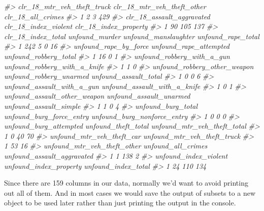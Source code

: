 \documentclass[
  12pt,
]{book}
\newenvironment{Shaded}{\begin{snugshade}}{\end{snugshade}}
\newcommand{\CommentTok}[1]{\textcolor[rgb]{0.37,0.37,0.37}{\textit{#1}}}
\begin{document}
\begin{Shaded}
\begin{Highlighting}[]
\CommentTok{\#>   clr\_18\_mtr\_veh\_theft\_truck clr\_18\_mtr\_veh\_theft\_other clr\_18\_all\_crimes}
\CommentTok{\#> 1                          2                          3               429}
\CommentTok{\#>   clr\_18\_assault\_aggravated clr\_18\_index\_violent clr\_18\_index\_property}
\CommentTok{\#> 1                        90                  105                   137}
\CommentTok{\#>   clr\_18\_index\_total unfound\_murder unfound\_manslaughter unfound\_rape\_total}
\CommentTok{\#> 1                242              5                    0                 16}
\CommentTok{\#>   unfound\_rape\_by\_force unfound\_rape\_attempted unfound\_robbery\_total}
\CommentTok{\#> 1                    16                      0                     1}
\CommentTok{\#>   unfound\_robbery\_with\_a\_gun unfound\_robbery\_with\_a\_knife}
\CommentTok{\#> 1                          1                            0}
\CommentTok{\#>   unfound\_robbery\_other\_weapon unfound\_robbery\_unarmed unfound\_assault\_total}
\CommentTok{\#> 1                            0                       0                     6}
\CommentTok{\#>   unfound\_assault\_with\_a\_gun unfound\_assault\_with\_a\_knife}
\CommentTok{\#> 1                          0                            1}
\CommentTok{\#>   unfound\_assault\_other\_weapon unfound\_assault\_unarmed unfound\_assault\_simple}
\CommentTok{\#> 1                            1                       0                      4}
\CommentTok{\#>   unfound\_burg\_total unfound\_burg\_force\_entry unfound\_burg\_nonforce\_entry}
\CommentTok{\#> 1                  0                        0                           0}
\CommentTok{\#>   unfound\_burg\_attempted unfound\_theft\_total unfound\_mtr\_veh\_theft\_total}
\CommentTok{\#> 1                      0                  40                          70}
\CommentTok{\#>   unfound\_mtr\_veh\_theft\_car unfound\_mtr\_veh\_theft\_truck}
\CommentTok{\#> 1                        53                          16}
\CommentTok{\#>   unfound\_mtr\_veh\_theft\_other unfound\_all\_crimes unfound\_assault\_aggravated}
\CommentTok{\#> 1                           1                138                          2}
\CommentTok{\#>   unfound\_index\_violent unfound\_index\_property unfound\_index\_total}
\CommentTok{\#> 1                    24                    110                 134}
\end{Highlighting}
\end{Shaded}

Since there are 159 columns in our data, normally we'd want to avoid printing out all of them. And in most cases we would save the output of subsets to a new object to be used later rather than just printing the output in the console.
\end{document}
